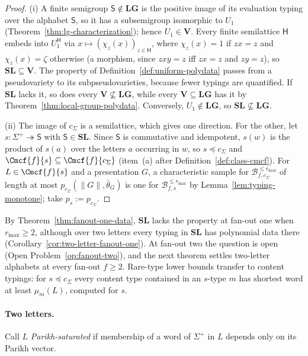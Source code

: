 \begin{proof}
(i) A finite semigroup $\mathsf S\notin\mathbf{LG}$ is the positive image of
its evaluation typing over the alphabet $\mathsf S$, so it has a subsemigroup
isomorphic to $U_1$ (Theorem~\ref{thm:lg-characterization}); hence
$U_1\in\mathbf V$.  Every finite semilattice $\mathsf H$ embeds into
$U_1^{\mathsf H}$ via $x\mapsto(\chi_z(x))_{z\in\mathsf H}$, where $\chi_z(x)=1$ if
$zx=z$ and $\chi_z(x)=\zeta$ otherwise (a morphism, since $zxy=z$ iff $zx=z$ and
$zy=z$), so $\mathbf{SL}\subseteq\mathbf V$.  The property of
Definition~\ref{def:uniform-polydata} passes from a pseudovariety to its
subpseudovarieties, because fewer typings are quantified.  If $\mathbf{SL}$
lacks it, so does every $\mathbf V\not\subseteq\mathbf{LG}$, while every
$\mathbf V\subseteq\mathbf{LG}$ has it by Theorem~\ref{thm:local-group-polydata}.
Conversely, $U_1\notin\mathbf{LG}$, so $\mathbf{SL}\not\subseteq\mathbf{LG}$.

(ii) The image of $c_\Sigma$ is a semilattice, which gives one direction.  For
the other, let $s:\Sigma^+\twoheadrightarrow\mathsf S$ with $\mathsf S\in\mathbf{SL}$.
Since $\mathsf S$ is commutative and idempotent, $s(w)$ is the product of
$s(a)$ over the letters $a$ occurring in $w$, so $s\preceq c_\Sigma$ and
$\Cmcf{f}{s}\subseteq\Cmcf{f}{c_\Sigma}$ (item~(a) after
Definition~\ref{def:class-cmcf}).  For $L\in\Cmcf{f}{s}$ and a presentation $G$,
a characteristic sample for $\mathcal B^{\le r_{\max}}_{f,c_\Sigma}$ of length at
most $p_{c_\Sigma}(\|G\|,\bar\theta_G)$ is one for
$\mathcal B^{\le r_{\max}}_{f,s}$ by Lemma~\ref{lem:typing-monotone}; take
$p_{s}:=p_{c_\Sigma}$.
\end{proof}

By Theorem~\ref{thm:fanout-one-data}, $\mathbf{SL}$ lacks the property at
fan-out one when $r_{\max}\ge2$, although over two letters every typing in
$\mathbf{SL}$ has polynomial data there (Corollary~\ref{cor:two-letter-fanout-one}).
At fan-out two the question is open (Open Problem~\ref{op:fanout-two}), and the
next theorem settles two-letter alphabets at every fan-out $f\ge2$.  Rare-type lower bounds transfer to content
typings: for $s\preceq c_\Sigma$ every content type contained in an $s$-type $m$
has shortest word at least $\mu_m(L)$, computed for $s$.

\paragraph{Two letters.}
Call $L$ \emph{Parikh-saturated} if membership of a word of $\Sigma^+$ in $L$
depends only on its Parikh vector.

